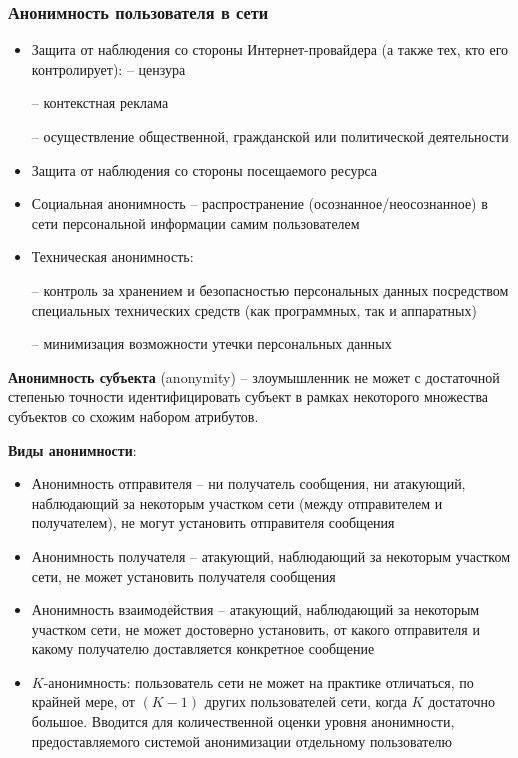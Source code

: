 
\subsubsection{Анонимность пользователя в сети}

\begin{itemize}
    \item Защита от наблюдения со стороны Интернет-провайдера (а также тех, кто его контролирует):
    – цензура
    
    – контекстная реклама
    
    – осуществление общественной, гражданской или политической деятельности
    \item Защита от наблюдения со стороны посещаемого ресурса    
\end{itemize}

\begin{itemize}
    \item Социальная анонимность – распространение (осознанное/неосознанное) в сети
персональной информации самим пользователем
    \item Техническая анонимность:
    
    – контроль за хранением и безопасностью персональных данных посредством специальных технических средств (как программных, так и аппаратных)
    
    – минимизация возможности утечки персональных данных
\end{itemize}

\textbf{Анонимность субъекта} (anonymity) -- злоумышленник не может с достаточной степенью точности идентифицировать субъект в рамках некоторого множества субъектов со схожим
набором атрибутов.

\textbf{Виды анонимности}:
\begin{itemize}
    \item Анонимность отправителя -- ни получатель сообщения, ни атакующий, наблюдающий за некоторым участком сети (между отправителем и получателем), не могут установить отправителя сообщения
    \item Анонимность получателя -- атакующий, наблюдающий за некоторым участком сети, не может установить получателя сообщения
    \item Анонимность взаимодействия -- атакующий, наблюдающий за некоторым участком сети, не может достоверно установить, от какого отправителя и какому получателю доставляется конкретное сообщение
    \item $K$-анонимность: пользователь сети не может на практике отличаться, по крайней мере, от $(K - 1)$ других пользователей сети, когда $K$ достаточно большое. Вводится для количественной оценки уровня анонимности, предоставляемого системой анонимизации отдельному пользователю
\end{itemize}

